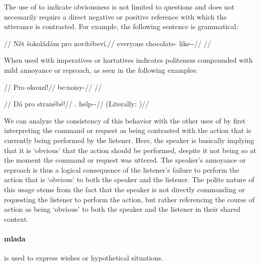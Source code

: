 The use of  to indicate obviousness is not limited to questions and
does not necessarily require a direct negative or positive reference with which
the utterance is contrasted. For example, the following sentence is grammatical:

\pex
\begingl
	\glpreamble {}//
	\gla Nět šokoládám pro novítébeví.//
	\glb everyone chocolate-\Agt{} \Cntr{} like-\Ben{}-\Cont{}//
	\glft {}//
\endgl
\xe

When used with imperatives or hortatives  indicates politeness
compounded with mild annoyance or reproach, as seen in the following examples:

\pex
\begingl
	\glpreamble {}//
	\gla Pro okouzí!//
	\glb \Cntr{} be:noisy-\N{}\Imp{}//
	\glft {}//
\endgl
\xe

\pex
\begingl
	\glpreamble {}//
	\gla Dá pro stranébé!//
	\glb \First.\Sg{} \Cntr{} help-\Ben{}-\Hort{}//
	\glft {} (Literally: )//
\endgl
\xe

We can analyze the consistency of this behavior with the other uses of 
by first interpreting the command or request as being contrasted with the action
that is currently being performed by the listener. Here, the speaker is
basically implying that it is `obvious' that the action should be performed,
despite it not being so at the moment the command or request was uttered. The
speaker's annoyance or reproach is thus a logical consequence of the listener's
failure to perform the action that is `obvious' to both the speaker and the
listener. The polite nature of this usage stems from the fact that the speaker
is not directly commanding or requesting the listener to perform the action, but
rather referencing the course of action as being `obvious' to both the speaker
and the listener in their shared context.

\paragraph{mlada}  is used to express wishes or hypothetical situations.

